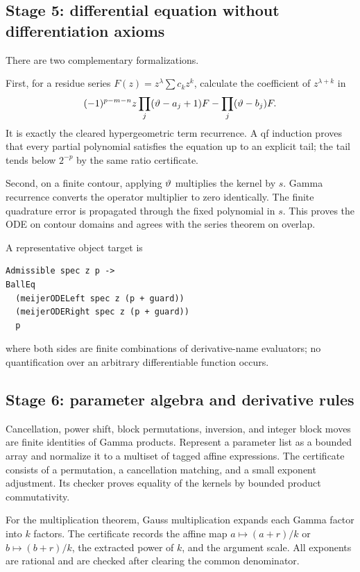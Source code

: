 \subsection{Stage 5: differential equation without differentiation axioms}

There are two complementary formalizations.

First, for a residue series $F(z)=z^\lambda\sum c_kz^k$, calculate the
coefficient of $z^{\lambda+k}$ in
\[
 (-1)^{p-m-n}z\prod_j(\vartheta-a_j+1)F
 -\prod_j(\vartheta-b_j)F.
\]
It is exactly the cleared hypergeometric term recurrence.  A qf induction proves
that every partial polynomial satisfies the equation up to an explicit tail;
the tail tends below $2^{-p}$ by the same ratio certificate.

Second, on a finite contour, applying $\vartheta$ multiplies the kernel by $s$.
Gamma recurrence converts the operator multiplier to zero identically.  The
finite quadrature error is propagated through the fixed polynomial in $s$.
This proves the ODE on contour domains and agrees with the series theorem on
overlap.

A representative object target is
\begin{lstlisting}[language={}]
Admissible spec z p ->
BallEq
  (meijerODELeft spec z (p + guard))
  (meijerODERight spec z (p + guard))
  p
\end{lstlisting}
where both sides are finite combinations of derivative-name evaluators; no
quantification over an arbitrary differentiable function occurs.

\subsection{Stage 6: parameter algebra and derivative rules}

Cancellation, power shift, block permutations, inversion, and integer block
moves are finite identities of Gamma products.  Represent a parameter list as
a bounded array and normalize it to a multiset of tagged affine expressions.
The certificate consists of a permutation, a cancellation matching, and a
small exponent adjustment.  Its checker proves equality of the kernels by
bounded product commutativity.

For the multiplication theorem, Gauss multiplication expands each Gamma
factor into $k$ factors.  The certificate records the affine map
$a\mapsto(a+r)/k$ or $b\mapsto(b+r)/k$, the extracted power of $k$, and the
argument scale.  All exponents are rational and are checked after clearing the
common denominator.

